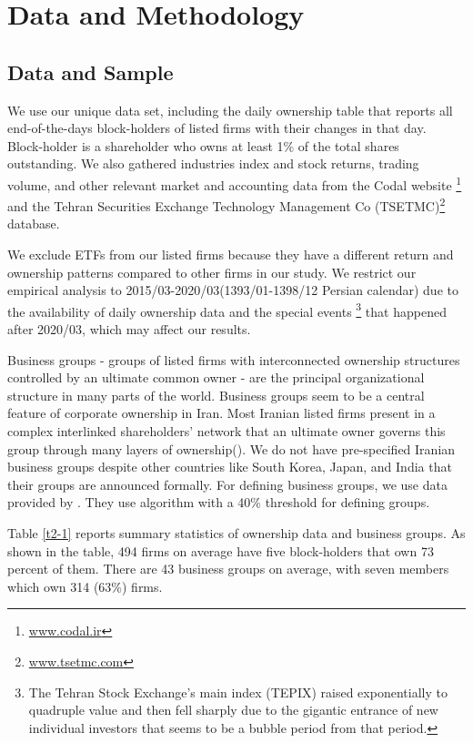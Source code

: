
\section{{Data and Methodology}}



\subsection{{Data and Sample}}


We  use our unique data set, including the daily ownership table that reports all end-of-the-days block-holders of listed firms with their changes in that day.  Block-holder is a shareholder who owns at least 1\% of the total shares outstanding. 
	We also gathered industries index and stock returns, trading volume, and other relevant market and accounting data from the Codal website \footnote{\href{http://www.codal.ir}{www.codal.ir}}
and the  Tehran Securities Exchange Technology Management Co (TSETMC)\footnote{\href{http://www.tsetmc.com}{www.tsetmc.com}} database.

We exclude ETFs from our listed firms because they have a different return and ownership patterns compared to other firms in our study.
We restrict our empirical analysis to 2015/03-2020/03(1393/01-1398/12 Persian calendar) due to the availability of daily ownership data and the special events \footnote{
	The Tehran Stock Exchange's main index (TEPIX) raised exponentially to quadruple value and then fell sharply due to the gigantic entrance of new individual investors that seems to be a bubble period from that period.} that happened after 2020/03, which may affect our results. 

Business groups - groups of listed firms with interconnected ownership structures controlled by an ultimate common owner - are the principal organizational structure in many parts of the world.
Business groups seem to be a central feature of corporate ownership in Iran. 
Most Iranian listed firms present in a complex interlinked shareholders' network that an ultimate owner governs this group through many layers of ownership({\cite{Aliabadi2022}}).  
We do not have pre-specified Iranian business groups despite other countries like South Korea, Japan, and India that their groups are announced formally.
For defining business groups, we use data provided by {\cite{Aliabadi2022}}.
They use \cite{almeida2011structure} algorithm with a 40\% threshold for defining groups. 


Table \ref{t2-1} reports summary statistics of ownership data and business groups. As shown in the table, 494 firms on average have five block-holders that own 73 percent of them. There are 43 business groups on average, with seven members which own 314 (63\%) firms. 






